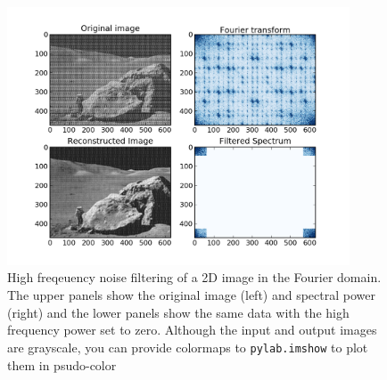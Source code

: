 

\begin{figure}
\begin{centering}\includegraphics[width=4in]{fig/fft_imdenoise}\par\end{centering}

\caption{\label{fig:fft_imdenoise}High freqeuency noise filtering of a 2D image in the Fourier domain.  The upper panels show the original image (left) and spectral power (right) and the lower panels show the same data with the high frequency power set to zero.  Although the input and output images are grayscale, you can provide colormaps to \texttt{pylab.imshow} to plot them in psudo-color}
\end{figure}
